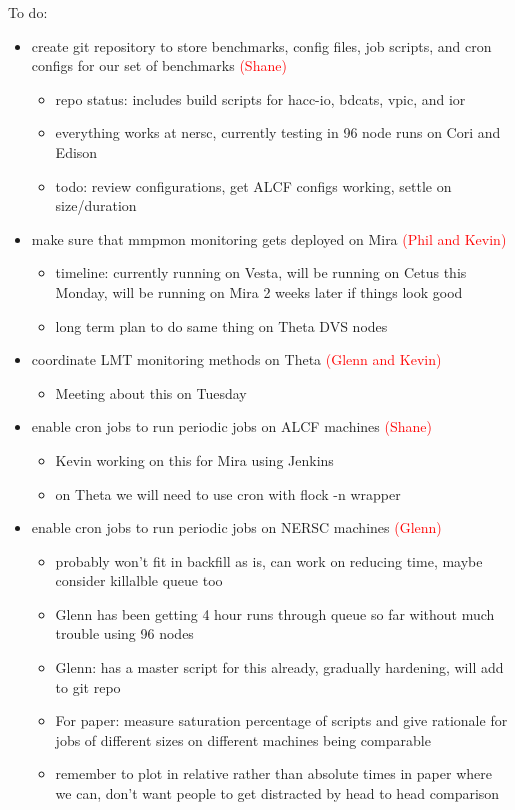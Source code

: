 \documentclass[conference,10pt,compsocconf]{IEEEtran}
\newcommand{\assign}[1]{\textcolor{red}{(#1)}}
\begin{document}
To do:
\begin{itemize}
\item create git repository to store benchmarks, config files, job scripts,
and cron configs for our set of benchmarks \assign{Shane}
\begin{itemize}
\item repo status: includes build scripts for hacc-io, bdcats, vpic, and ior
\item everything works at nersc, currently testing in 96 node runs on Cori
and Edison
\item todo: review configurations, get ALCF configs working, settle on
size/duration
\end{itemize}


\item make sure that mmpmon monitoring gets deployed on Mira \assign{Phil and
Kevin}
\begin{itemize}
\item timeline: currently running on Vesta, will be running on Cetus this
Monday, will be running on Mira 2 weeks later if things look good
\item long term plan to do same thing on Theta DVS nodes
\end{itemize}

\item coordinate LMT monitoring methods on Theta \assign{Glenn and Kevin}
\begin{itemize}
\item Meeting about this on Tuesday
\end{itemize}

\item enable cron jobs to run periodic jobs on ALCF machines \assign{Shane}
\begin{itemize}
\item Kevin working on this for Mira using Jenkins
\item on Theta we will need to use cron with flock -n wrapper
\end{itemize}

\item enable cron jobs to run periodic jobs on NERSC machines \assign{Glenn}
\begin{itemize}
\item probably won't fit in backfill as is, can work on reducing time, maybe
consider killalble queue too
\item Glenn has been getting 4 hour runs through queue so far without much
trouble using 96 nodes
\item Glenn: has a master script for this already, gradually hardening, will
add to git repo
\item For paper: measure saturation percentage of scripts and give rationale
for jobs of different sizes on different machines being comparable
\item remember to plot in relative rather than absolute times in paper where
we can, don't want people to get distracted by head to head comparison
\end{itemize}


\end{itemize}
\end{document}

